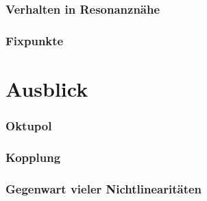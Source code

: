\documentclass[hyperref={pdfpagelabels=false}]{beamer}
\begin{document}
\begin{frame}
 \frametitle{Verhalten in Resonanznähe}
\end{frame}

\begin{frame}
 \frametitle{Fixpunkte}
\end{frame}

\section{Ausblick}
\begin{frame}
 \frametitle{Oktupol}
\end{frame}

\begin{frame}
 \frametitle{Kopplung}
\end{frame}

\begin{frame}
 \frametitle{Gegenwart vieler Nichtlinearitäten}
\end{frame}
\end{document}
